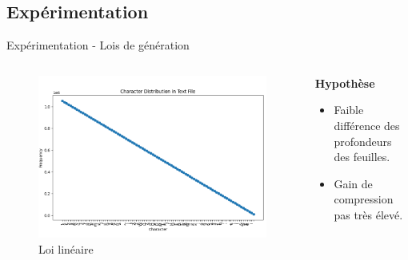 \documentclass{beamer}
\begin{document}
\subsection{Expérimentation}


\begin{frame}{Expérimentation - Lois de génération}
    \begin{columns}[T]
        \begin{column}{0.6\textwidth}
            \begin{figure}
                \centering
                \includegraphics[width=\textwidth]{../assets/linear.png}
                \caption{Loi linéaire}
            \end{figure}
        \end{column}
        \begin{column}{0.5\textwidth}
            \vspace{10pt}
            \textbf{Hypothèse} \\
            \vspace{25pt}
            \begin{itemize}
                \item Faible différence des profondeurs des feuilles.
                \item Gain de compression pas très élevé.
            \end{itemize}
        \end{column}
    \end{columns}
\end{frame}
\end{document}
